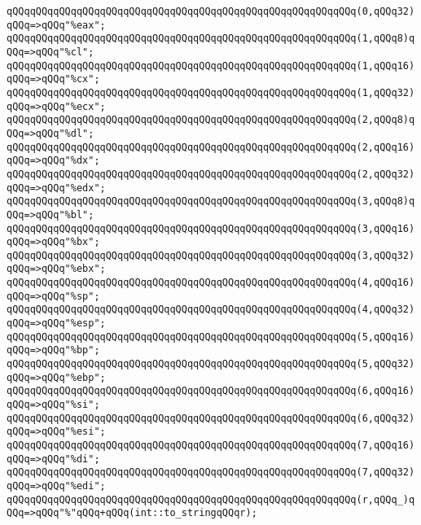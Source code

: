 \verb|qQQqqQQqqQQqqQQqqQQqqQQqqQQqqQQqqQQqqQQqqQQqqQQqqQQqqQQqqQQq(0,qQQq32)qQQq=>qQQq"%eax";|\newline
\verb|qQQqqQQqqQQqqQQqqQQqqQQqqQQqqQQqqQQqqQQqqQQqqQQqqQQqqQQqqQQq(1,qQQq8)qQQq=>qQQq"%cl";|\newline
\verb|qQQqqQQqqQQqqQQqqQQqqQQqqQQqqQQqqQQqqQQqqQQqqQQqqQQqqQQqqQQq(1,qQQq16)qQQq=>qQQq"%cx";|\newline
\verb|qQQqqQQqqQQqqQQqqQQqqQQqqQQqqQQqqQQqqQQqqQQqqQQqqQQqqQQqqQQq(1,qQQq32)qQQq=>qQQq"%ecx";|\newline
\verb|qQQqqQQqqQQqqQQqqQQqqQQqqQQqqQQqqQQqqQQqqQQqqQQqqQQqqQQqqQQq(2,qQQq8)qQQq=>qQQq"%dl";|\newline
\verb|qQQqqQQqqQQqqQQqqQQqqQQqqQQqqQQqqQQqqQQqqQQqqQQqqQQqqQQqqQQq(2,qQQq16)qQQq=>qQQq"%dx";|\newline
\verb|qQQqqQQqqQQqqQQqqQQqqQQqqQQqqQQqqQQqqQQqqQQqqQQqqQQqqQQqqQQq(2,qQQq32)qQQq=>qQQq"%edx";|\newline
\verb|qQQqqQQqqQQqqQQqqQQqqQQqqQQqqQQqqQQqqQQqqQQqqQQqqQQqqQQqqQQq(3,qQQq8)qQQq=>qQQq"%bl";|\newline
\verb|qQQqqQQqqQQqqQQqqQQqqQQqqQQqqQQqqQQqqQQqqQQqqQQqqQQqqQQqqQQq(3,qQQq16)qQQq=>qQQq"%bx";|\newline
\verb|qQQqqQQqqQQqqQQqqQQqqQQqqQQqqQQqqQQqqQQqqQQqqQQqqQQqqQQqqQQq(3,qQQq32)qQQq=>qQQq"%ebx";|\newline
\verb|qQQqqQQqqQQqqQQqqQQqqQQqqQQqqQQqqQQqqQQqqQQqqQQqqQQqqQQqqQQq(4,qQQq16)qQQq=>qQQq"%sp";|\newline
\verb|qQQqqQQqqQQqqQQqqQQqqQQqqQQqqQQqqQQqqQQqqQQqqQQqqQQqqQQqqQQq(4,qQQq32)qQQq=>qQQq"%esp";|\newline
\verb|qQQqqQQqqQQqqQQqqQQqqQQqqQQqqQQqqQQqqQQqqQQqqQQqqQQqqQQqqQQq(5,qQQq16)qQQq=>qQQq"%bp";|\newline
\verb|qQQqqQQqqQQqqQQqqQQqqQQqqQQqqQQqqQQqqQQqqQQqqQQqqQQqqQQqqQQq(5,qQQq32)qQQq=>qQQq"%ebp";|\newline
\verb|qQQqqQQqqQQqqQQqqQQqqQQqqQQqqQQqqQQqqQQqqQQqqQQqqQQqqQQqqQQq(6,qQQq16)qQQq=>qQQq"%si";|\newline
\verb|qQQqqQQqqQQqqQQqqQQqqQQqqQQqqQQqqQQqqQQqqQQqqQQqqQQqqQQqqQQq(6,qQQq32)qQQq=>qQQq"%esi";|\newline
\verb|qQQqqQQqqQQqqQQqqQQqqQQqqQQqqQQqqQQqqQQqqQQqqQQqqQQqqQQqqQQq(7,qQQq16)qQQq=>qQQq"%di";|\newline
\verb|qQQqqQQqqQQqqQQqqQQqqQQqqQQqqQQqqQQqqQQqqQQqqQQqqQQqqQQqqQQq(7,qQQq32)qQQq=>qQQq"%edi";|\newline
\verb|qQQqqQQqqQQqqQQqqQQqqQQqqQQqqQQqqQQqqQQqqQQqqQQqqQQqqQQqqQQq(r,qQQq_)qQQq=>qQQq"%"qQQq+qQQq(int::to_stringqQQqr);|\newline
